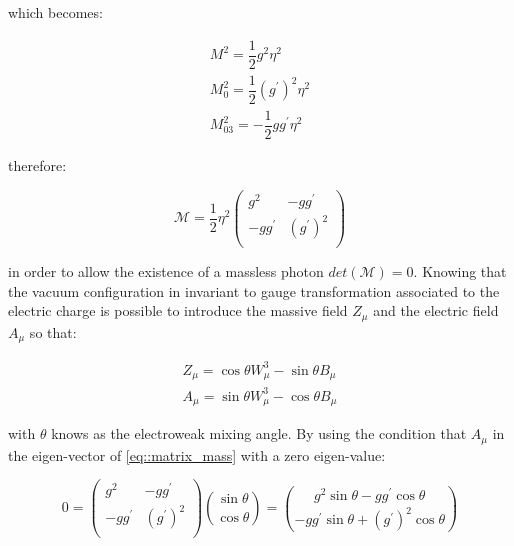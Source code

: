 which becomes:

\begin{equation}
\begin{array}{c}
M^{2}  = \dfrac{1}{2} g^{2} \eta^{2}\\
M_{0}^{2}  = \dfrac{1}{2} (g^{\prime})^{2} \eta^{2}\\
M_{03}^{2}  = -\dfrac{1}{2} gg^{\prime} \eta^{2}
\end{array}
\end{equation}

therefore:

\begin{equation}
\mathcal{M} =  \dfrac{1}{2} \eta^{2}
\begin{pmatrix}
 g^{2} & -gg^{\prime} \\
-gg^{\prime} & (g^{\prime})^{2} \\
\end{pmatrix}
\label{eq::matrix_mass}
\end{equation}

in order to allow the existence of a massless photon $det(\mathcal{M}) = 0$. Knowing that the vacuum configuration in invariant to gauge transformation associated to the electric charge is possible to introduce the massive field $Z_{\mu}$ and the electric field $A_{\mu}$ so that:

\begin{equation}
\begin{array}{c}
Z_{\mu} = \cos\theta W^{3}_{\mu} -\sin\theta B_{\mu}\\
A_{\mu} =\sin\theta W^{3}_{\mu} - \cos\theta B_{\mu}

\end{array}
\label{eq::fields_rotation}
\end{equation}

with $\theta$ knows as the electroweak mixing angle. By using the condition that $A_{\mu}$ in the eigen-vector of \autoref{eq::matrix_mass} with a zero eigen-value:

\begin{equation}
0 = 
\begin{pmatrix}
g^{2} & -gg^{\prime} \\
-gg^{\prime} & (g^{\prime})^{2} \\
\end{pmatrix}
\binom{\sin\theta}{\cos\theta}
=
\binom{g^{2}\sin\theta - gg^{\prime}\cos\theta}{-gg^{\prime}\sin\theta + (g^{\prime})^{2}\cos\theta}
\label{eq::matrix_rotation}
\end{equation}

